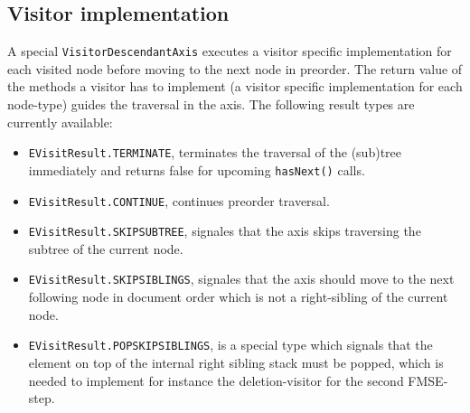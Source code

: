 \subsection{Visitor implementation}\label{subsec::visitor}
A special \texttt{VisitorDescendantAxis} executes a visitor specific implementation for each visited node before moving to the next node in preorder. The return value of the methods a visitor has to implement (a visitor specific implementation for each node-type) guides the traversal in the axis. The following result types are currently available:

\begin{itemize}
\item \texttt{EVisitResult.TERMINATE}, terminates the traversal of the (sub)tree immediately and returns false for upcoming \texttt{hasNext()} calls.
\item \texttt{EVisitResult.CONTINUE}, continues preorder traversal.
\item \texttt{EVisitResult.SKIPSUBTREE}, signales that the axis skips traversing the subtree of the current node.
\item \texttt{EVisitResult.SKIPSIBLINGS}, signales that the axis should move to the next following node in document order which is not a right-sibling of the current node.
\item \texttt{EVisitResult.POPSKIPSIBLINGS}, is a special type which signals that the element on top of the internal right sibling stack must be popped, which is needed to implement for instance the deletion-visitor for the second FMSE-step.
\end{itemize}

